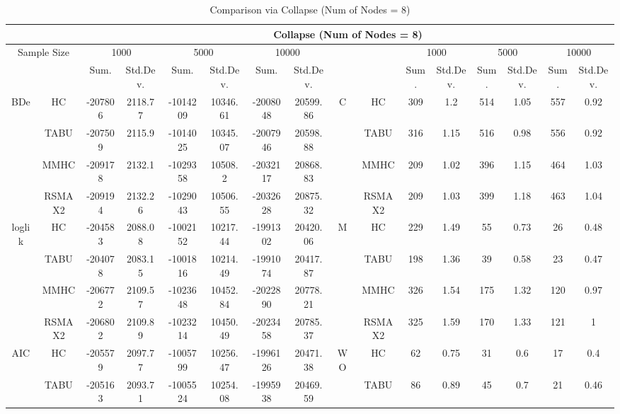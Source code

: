 \begin{table}[p]																										
\centering	\caption{Comparison  via Collapse (Num of Nodes = 8)}	\tiny																						
{\tabcolsep=0.01in																										
\begin{tabular}{cc||cc|cc|cc||cc|cc|cc|cc}																										
\hline																										
&	&	\multicolumn{14}{c}{Collapse	(Num	of	Nodes	=	8)}\tabularnewline																			
\hline																										
\multicolumn{2}{c||}{Sample	Size}	&	\multicolumn{2}{c|}{1000}	&	\multicolumn{2}{c|}{5000}	&	\multicolumn{2}{c||}{10000}	&	&	&	\multicolumn{2}{c|}{1000}	&	\multicolumn{2}{c|}{5000}	&	\multicolumn{2}{c}{10000}\tabularnewline											
\hline																										
&	&	Sum.	&	Std.Dev.	&	Sum.	&	Std.Dev.	&	Sum.	&	Std.Dev.	&	&	&	Sum.	&	Std.Dev.	&	Sum.	&	Std.Dev.	&	Sum.	&	Std.Dev.\tabularnewline
\hline																										
\hline																										
\multirow{4}{*}{BDe} & HC &	-207806 & 	2118.77 & 	-1014209 & 	10346.61 & 	-2008048 & 	20599.86 & 	\multirow{4}{*}{C} & HC &	309 & 	1.2 & 	514 & 	1.05 & 	557 & 	0.92\tabularnewline													
& TABU &	-207509 & 	2115.9 & 	-1014025 & 	10345.07 & 	-2007946 & 	20598.88 & 	& TABU &	316 & 	1.15 & 	516 & 	0.98 & 	556 & 	0.92\tabularnewline													
& MMHC &	-209178 & 	2132.1 & 	-1029358 & 	10508.2 & 	-2032117 & 	20868.83 & 	& MMHC &	209 & 	1.02 & 	396 & 	1.15 & 	464 & 	1.03\tabularnewline													
& RSMAX2 &	-209194 & 	2132.26 & 	-1029043 & 	10506.55 & 	-2032628 & 	20875.32 & 	& RSMAX2 &	209 & 	1.03 & 	399 & 	1.18 & 	463 & 	1.04\tabularnewline													
\hline																										
\multirow{4}{*}{loglik} & HC &	-204583 & 	2088.08 & 	-1002152 & 	10217.44 & 	-1991302 & 	20420.06 & 	\multirow{4}{*}{M} & HC &	229 & 	1.49 & 	55 & 	0.73 & 	26 & 	0.48\tabularnewline													
& TABU &	-204078 & 	2083.15 & 	-1001816 & 	10214.49 & 	-1991074 & 	20417.87 & 	& TABU &	198 & 	1.36 & 	39 & 	0.58 & 	23 & 	0.47\tabularnewline													
& MMHC &	-206772 & 	2109.57 & 	-1023648 & 	10452.84 & 	-2022890 & 	20778.21 & 	& MMHC &	326 & 	1.54 & 	175 & 	1.32 & 	120 & 	0.97\tabularnewline													
& RSMAX2 &	-206802 & 	2109.89 & 	-1023214 & 	10450.49 & 	-2023458 & 	20785.37 & 	& RSMAX2 &	325 & 	1.59 & 	170 & 	1.33 & 	121 & 	1\tabularnewline													
\hline																										
\multirow{4}{*}{AIC} & HC &	-205579 & 	2097.77 & 	-1005799 & 	10256.47 & 	-1996126 & 	20471.38 & 	\multirow{4}{*}{WO} & HC &	62 & 	0.75 & 	31 & 	0.6 & 	17 & 	0.4\tabularnewline													
& TABU &	-205163 & 	2093.71 & 	-1005524 & 	10254.08 & 	-1995938 & 	20469.59 & 	& TABU &	86 & 	0.89 & 	45 & 	0.7 & 	21 & 	0.46\tabularnewline													

\end{tabular}}
\end{table}
